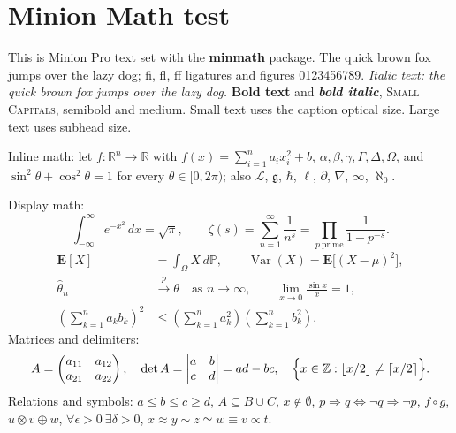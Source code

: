 \documentclass[11pt]{article}
\begin{document}
\section*{Minion Math test}

This is Minion Pro text set with the \textbf{minmath} package. The quick
brown fox jumps over the lazy dog; fi, fl, ff ligatures and figures 0123456789.
\textit{Italic text: the quick brown fox jumps over the lazy dog.}
\textbf{Bold text} and \textbf{\textit{bold italic}}, \textsc{Small Capitals},
{\selectfont semibold} and {\selectfont medium}.
{\small Small text uses the caption optical size.} {\Large Large text uses
subhead size.}

Inline math: let $f\colon \mathbb{R}^n \to \mathbb{R}$ with
$f(x) = \sum_{i=1}^{n} a_i x_i^2 + b$, $\alpha,\beta,\gamma,\Gamma,\Delta,
\Omega$, and $\sin^2\theta + \cos^2\theta = 1$ for every
$\theta\in[0,2\pi)$; also $\mathcal{L}$, $\mathfrak{g}$, $\hbar$, $\ell$,
$\partial$, $\nabla$, $\infty$, $\aleph_0$.

Display math:
\begin{equation}
  \int_{-\infty}^{\infty} e^{-x^2}\,dx = \sqrt{\pi},
  \qquad
  \zeta(s) = \sum_{n=1}^{\infty} \frac{1}{n^s}
           = \prod_{p\ \text{prime}} \frac{1}{1-p^{-s}} .
\end{equation}
\begin{align}
  \mathbf{E}[X] &= \int_\Omega X\,d\mathbb{P},\qquad
  \operatorname{Var}(X) = \mathbf{E}\bigl[(X-\mu)^2\bigr], \\
  \hat{\theta}_n &\xrightarrow{\;p\;} \theta
  \quad\text{as } n\to\infty,\qquad
  \lim_{x\to 0}\frac{\sin x}{x} = 1, \\
  \left( \sum_{k=1}^{n} a_k b_k \right)^{\!2}
  &\le \left(\sum_{k=1}^{n} a_k^2\right)\left(\sum_{k=1}^{n} b_k^2\right).
\end{align}
Matrices and delimiters:
\[
  A = \begin{pmatrix} a_{11} & a_{12} \\ a_{21} & a_{22} \end{pmatrix},\quad
  \det A = \begin{vmatrix} a & b \\ c & d \end{vmatrix} = ad-bc,\quad
  \Bigl\{ x\in\mathbb{Z} : \lfloor x/2 \rfloor \ne \lceil x/2 \rceil \Bigr\}.
\]
Relations and symbols:
$a \le b \leq c \ge d$, $A\subseteq B\cup C$, $x\notin\emptyset$,
$p\Rightarrow q \iff \neg q\Rightarrow\neg p$, $f\circ g$,
$u\otimes v\oplus w$, $\forall\epsilon>0\ \exists\delta>0$,
$x \approx y \sim z \simeq w \equiv v \propto t$.
\end{document}
